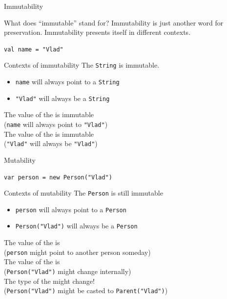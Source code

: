 \begin{frame}[fragile]{Immutability}
\begin{block}{What does ``immutable'' stand for?}
Immutability is just another word for preservation. Immutability presents itself
in different contexts.
\end{block}
\pause
\begin{center}
\lstinline!val name = "Vlad"!
\end{center}
\pause
\begin{block}{Contexts of immutability}
The  \lstinline!String! is immutable.\\
\begin{itemize}
\item \lstinline!name! will always point to a \lstinline!String!
\item \lstinline!"Vlad"! will always be a \lstinline!String!
\end{itemize}
\pause
The value of the  is immutable\\
(\lstinline!name! will always point to \lstinline!"Vlad"!)\\
\pause
The value of the  is immutable\\
(\lstinline!"Vlad"! will always be \lstinline!"Vlad"!)
\end{block}
\end{frame}

\begin{frame}[fragile]{Mutability}
\begin{center}
\lstinline!var person = new Person("Vlad")!
\end{center}
\pause
\begin{block}{Contexts of mutability}
The  \lstinline!Person! is still \alert{im}mutable\\
\begin{itemize}
\item \lstinline!person! will always point to a \lstinline!Person!
\item \lstinline!Person("Vlad")! will always be a \lstinline!Person!
\end{itemize}
\pause
The value of the  is \\
(\lstinline!person! might point to \alert{another} person someday)\\
\pause
The value of the  is \\
(\lstinline!Person("Vlad")! might \alert{change internally})\\
\pause
The \alert{type} of the  might \alert{change}!\\
(\lstinline!Person("Vlad")! might be casted to \lstinline!Parent("Vlad")!)
\end{block}
\end{frame}

